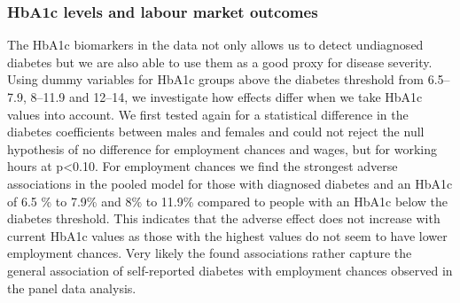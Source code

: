 \subsubsection{HbA1c levels and labour market outcomes}

The \ac{HbA1c} biomarkers in the data not only allows us to detect
undiagnosed diabetes but we are also able to use them as a good proxy
for disease severity. Using dummy variables for \ac{HbA1c} groups
above the diabetes threshold from 6.5--7.9, 8--11.9 and 12--14, we
investigate how effects differ when we take \ac{HbA1c} values into
account. We first tested again for a statistical difference in the
diabetes coefficients between males and females and could not reject
the null hypothesis of no difference for employment chances and wages,
but for working hours at p<0.10. For employment chances we find the
strongest adverse associations in the pooled model for those with
diagnosed diabetes and an \ac{HbA1c} of 6.5 \% to 7.9\% and 8\% to
11.9\% compared to people with an \ac{HbA1c} below the diabetes threshold.
This indicates that the adverse effect does not increase with current
\ac{HbA1c} values as those with the highest values do not seem to
have lower employment chances. Very likely the found associations
rather capture the general association of self-reported diabetes with
employment chances observed in the panel data analysis.



